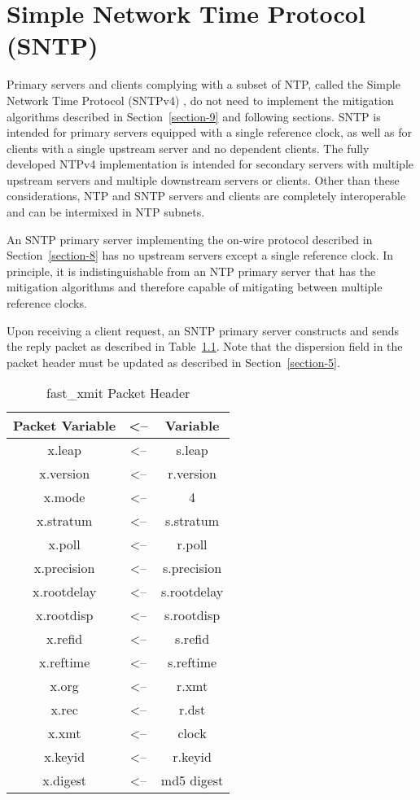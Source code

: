 \chapter{Simple Network Time Protocol (SNTP)}
\label{section-14}

Primary servers and clients complying with a subset of NTP, called
the Simple Network Time Protocol (SNTPv4) \cite{RFC4330}, do not need to
implement the mitigation algorithms described in Section~\ref{section-9} and
following sections.  SNTP is intended for primary servers equipped
with a single reference clock, as well as for clients with a single
upstream server and no dependent clients.  The fully developed NTPv4
implementation is intended for secondary servers with multiple
upstream servers and multiple downstream servers or clients.  Other
than these considerations, NTP and SNTP servers and clients are
completely interoperable and can be intermixed in NTP subnets.

An SNTP primary server implementing the on-wire protocol described in
Section~\ref{section-8} has no upstream servers except a single reference clock.
In principle, it is indistinguishable from an NTP primary server that
has the mitigation algorithms and therefore capable of mitigating
between multiple reference clocks.

Upon receiving a client request, an SNTP primary server constructs
and sends the reply packet as described in Table~\ref{fast_xmit_packet_header}.  Note that the
dispersion field in the packet header must be updated as described in
Section~\ref{section-5}.

\begin{table}[htb]
\center
\begin{tabular}{c | c | c}
Packet Variable & <-- & Variable \\
\hline
\hline
x.leap      & <-- & s.leap      \\
x.version   & <-- & r.version   \\
x.mode      & <-- & 4           \\
x.stratum   & <-- & s.stratum   \\
x.poll      & <-- & r.poll      \\
x.precision & <-- & s.precision \\
x.rootdelay & <-- & s.rootdelay \\
x.rootdisp  & <-- & s.rootdisp  \\
x.refid     & <-- & s.refid     \\
x.reftime   & <-- & s.reftime   \\
x.org       & <-- & r.xmt       \\
x.rec       & <-- & r.dst       \\
x.xmt       & <-- & clock       \\
x.keyid     & <-- & r.keyid     \\
x.digest    & <-- & md5 digest  \\
\hline
\end{tabular}
\label{fast_xmit_packet_header}
\caption{fast\_xmit Packet Header}
\end{table}

